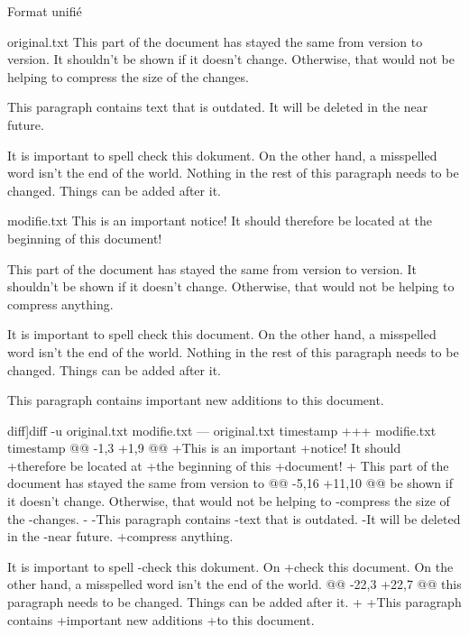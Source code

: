 \begin{frame}[fragile]{Format unifié}
\begin{tcbraster}[raster columns=3, raster valign=top, raster before skip=6pt]
  \begin{snvlisting}{original.txt}
This part of the
document has stayed the
same from version to
version.  It shouldn't
be shown if it doesn't
change.  Otherwise, that
would not be helping to
compress the size of the
changes.

This paragraph contains
text that is outdated.
It will be deleted in the
near future.

It is important to spell
check this dokument. On
the other hand, a
misspelled word isn't
the end of the world.
Nothing in the rest of
this paragraph needs to
be changed. Things can
be added after it.
  \end{snvlisting}
  \begin{snvlisting}{modifie.txt}
This is an important
notice! It should
therefore be located at
the beginning of this
document!

This part of the
document has stayed the
same from version to
version.  It shouldn't
be shown if it doesn't
change.  Otherwise, that
would not be helping to
compress anything.

It is important to spell
check this document. On
the other hand, a
misspelled word isn't
the end of the world.
Nothing in the rest of
this paragraph needs to
be changed. Things can
be added after it.

This paragraph contains
important new additions
to this document.
\end{snvlisting}
\begin{snvlisting}[[unified]diff]{diff -u original.txt modifie.txt}
--- original.txt   timestamp
+++ modifie.txt   timestamp
@@ -1,3 +1,9 @@
+This is an important
+notice! It should
+therefore be located at
+the beginning of this
+document!
+
 This part of the
 document has stayed the
 same from version to
@@ -5,16 +11,10 @@
 be shown if it doesn't
 change.  Otherwise, that
 would not be helping to
-compress the size of the
-changes.
-
-This paragraph contains
-text that is outdated.
-It will be deleted in the
-near future.
+compress anything.

 It is important to spell
-check this dokument. On
+check this document. On
 the other hand, a
 misspelled word isn't
 the end of the world.
@@ -22,3 +22,7 @@
 this paragraph needs to
 be changed. Things can
 be added after it.
+
+This paragraph contains
+important new additions
+to this document.
\end{snvlisting}
\end{tcbraster}
\end{frame}

